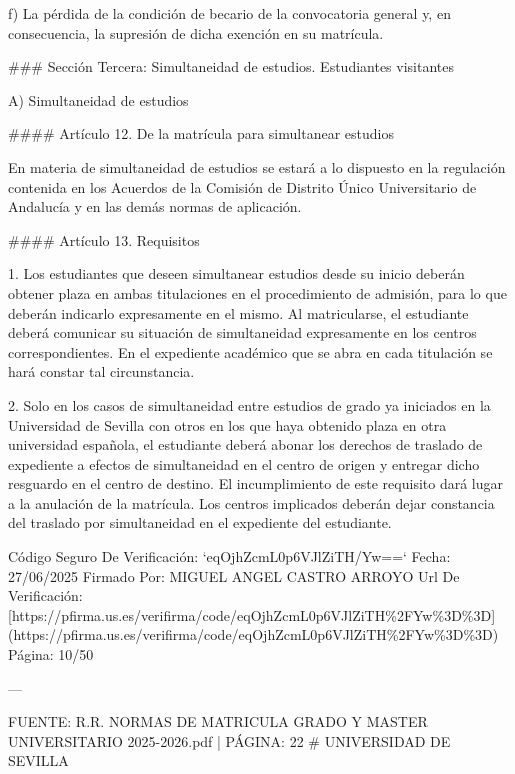 \documentclass{article}
\begin{document}
\begin{itemize}
\begin{itemize}
\begin{scriptsize}
                  f) La pérdida de la condición de becario de la convocatoria general y, en consecuencia, la supresión de dicha exención en su matrícula.

                  \#\#\# Sección Tercera: Simultaneidad de estudios. Estudiantes visitantes

                  A) Simultaneidad de estudios

                  \#\#\#\# Artículo 12. De la matrícula para simultanear estudios

                  En materia de simultaneidad de estudios se estará a lo dispuesto en la regulación contenida en los Acuerdos de la Comisión de Distrito Único Universitario de Andalucía y en las demás normas de aplicación.

                  \#\#\#\# Artículo 13. Requisitos

                  1. Los estudiantes que deseen simultanear estudios desde su inicio deberán obtener plaza en ambas titulaciones en el procedimiento de admisión, para lo que deberán indicarlo expresamente en el mismo. Al matricularse, el estudiante deberá comunicar su situación de simultaneidad expresamente en los centros correspondientes. En el expediente académico que se abra en cada titulación se hará constar tal circunstancia.

                  2. Solo en los casos de simultaneidad entre estudios de grado ya iniciados en la Universidad de Sevilla con otros en los que haya obtenido plaza en otra universidad española, el estudiante deberá abonar los derechos de traslado de expediente a efectos de simultaneidad en el centro de origen y entregar dicho resguardo en el centro de destino. El incumplimiento de este requisito dará lugar a la anulación de la matrícula. Los centros implicados deberán dejar constancia del traslado por simultaneidad en el expediente del estudiante.

                  Código Seguro De Verificación: `eqOjhZcmL0p6VJlZiTH/Yw==`
                  Fecha: 27/06/2025
                  Firmado Por: MIGUEL ANGEL CASTRO ARROYO
                  Url De Verificación: [https://pfirma.us.es/verifirma/code/eqOjhZcmL0p6VJlZiTH\%2FYw\%3D\%3D](https://pfirma.us.es/verifirma/code/eqOjhZcmL0p6VJlZiTH\%2FYw\%3D\%3D)
                  Página: 10/50

                  ---

                  FUENTE: R.R. NORMAS DE MATRICULA GRADO Y MASTER UNIVERSITARIO 2025-2026.pdf | PÁGINA: 22
                  \# UNIVERSIDAD DE SEVILLA


\end{scriptsize}
\end{itemize}
\end{itemize}
\end{document}
